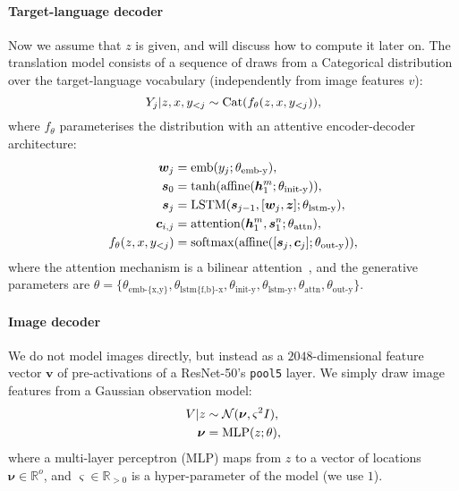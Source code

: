 \documentclass[11pt,a4paper]{article}
\DeclareMathOperator{\softmax}{softmax}
\DeclareMathOperator{\affine}{affine}
\DeclareMathOperator{\emb}{emb}
\DeclareMathOperator{\attention}{attention}
\DeclareMathOperator{\LSTM}{LSTM}
\DeclareMathOperator{\MLP}{MLP}
\DeclareMathOperator{\Cat}{Cat}
\begin{document}
\paragraph{Target-language decoder}
Now we assume that $z$ is given, and will discuss how to compute it later on. The translation model consists of a sequence of draws from a Categorical distribution over the target-language vocabulary (independently from image features $v$):
\begin{equation}
    Y_j | z, x, y_{<j} \sim \Cat(f_\theta(z, x, y_{<j} )), \notag
\end{equation}
where $f_\theta$ parameterises the distribution with an attentive encoder-decoder architecture:
\begin{align}
    \bm{w}_j &= \emb(y_j; \theta_\text{emb-y}), \notag\\
    \bm{s}_0 &= \tanh(\affine(\bm{h}_1^m; \theta_\text{init-y})), \notag\\
    \bm{s}_j &= \LSTM(\bm{s}_{j-1}, [\bm{w}_j, \bm{z}]; \theta_\text{lstm-y}), \notag\\
    \bm{c}_{i,j} &= \attention(\bm{h}^m_1, \bm{s}^n_{1}; \theta_\text{attn}), \notag\\
    f_\theta(z, x, y_{<j}) &= \softmax(\affine([\bm{s}_j, \bm{c}_j]; \theta_\text{out-y})), \notag
\end{align}
where the attention mechanism is a bilinear attention~\citep{Luongetal2015}, and the generative parameters are $\theta = \{ \theta_\text{emb-\{x,y\}}, \theta_\text{lstm\{f,b\}-x}, \theta_\text{init-y}, \theta_\text{lstm-y}, \theta_\text{attn}, \theta_\text{out-y} \}$.

\paragraph{Image decoder}
We do not model images directly, but instead as a $2048$-dimensional feature vector $\bm{v}$ of pre-activations of a ResNet-50's \texttt{pool5} layer.
We simply draw image features from a Gaussian observation model:
\begin{align}
	V|z &\sim \mathcal N(\boldsymbol \nu, \varsigma^2 I), \notag\\
\boldsymbol \nu &= \MLP(z; \theta), \label{eq:mlp_image_decoder}\end{align}
where a multi-layer perceptron (MLP) maps from $z$ to a vector of locations $\boldsymbol \nu \in \mathbb R^o$, and $\varsigma \in \mathbb R_{>0}$ is a hyper-parameter of the model (we use $1$). 
\end{document}
